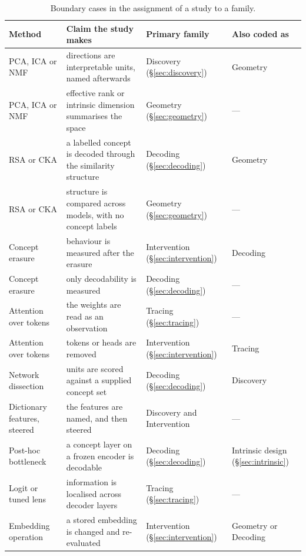 \begin{table}[!tbp]
\centering\small
\caption{Boundary cases in the assignment of a study to a family.}
\label{tab:boundary}
\setlength\tabcolsep{5pt}\begin{tabular}{@{}L{3.0cm} L{6.1cm} L{3.3cm} L{2.9cm}@{}}
\toprule
Method & Claim the study makes & Primary family & Also coded as \\
\midrule
PCA, ICA or NMF & directions are interpretable units, named afterwards & Discovery (\S\ref{sec:discovery}) & Geometry \\
PCA, ICA or NMF & effective rank or intrinsic dimension summarises the space & Geometry (\S\ref{sec:geometry}) & --- \\
\addlinespace
RSA or CKA & a labelled concept is decoded through the similarity structure & Decoding (\S\ref{sec:decoding}) & Geometry \\
RSA or CKA & structure is compared across models, with no concept labels & Geometry (\S\ref{sec:geometry}) & --- \\
\addlinespace
Concept erasure & behaviour is measured after the erasure & Intervention (\S\ref{sec:intervention}) & Decoding \\
Concept erasure & only decodability is measured & Decoding (\S\ref{sec:decoding}) & --- \\
\addlinespace
Attention over tokens & the weights are read as an observation & Tracing (\S\ref{sec:tracing}) & --- \\
Attention over tokens & tokens or heads are removed & Intervention (\S\ref{sec:intervention}) & Tracing \\
\addlinespace
Network dissection & units are scored against a supplied concept set & Decoding (\S\ref{sec:decoding}) & Discovery \\
\addlinespace
Dictionary features, steered & the features are named, and then steered & Discovery and Intervention & --- \\
\addlinespace
Post-hoc bottleneck & a concept layer on a frozen encoder is decodable & Decoding (\S\ref{sec:decoding}) & Intrinsic design (\S\ref{sec:intrinsic}) \\
\addlinespace
Logit or tuned lens & information is localised across decoder layers & Tracing (\S\ref{sec:tracing}) & --- \\
\addlinespace
Embedding operation & a stored embedding is changed and re-evaluated & Intervention (\S\ref{sec:intervention}) & Geometry or Decoding \\

\end{tabular}
\end{table}
